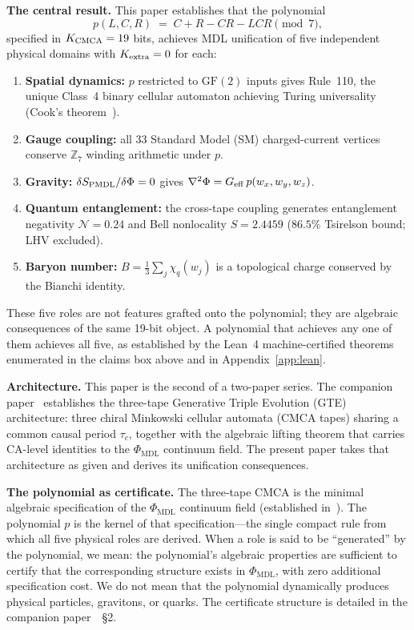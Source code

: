\documentclass[11pt]{article}
\theoremstyle{remark}
\newcommand{\PHIMDL}{\Phi_{\mathrm{MDL}}}
\newcommand{\ZS}{\mathbb{Z}_7}
\newcommand{\PMDL}{S_{\rm PMDL}}
\begin{document}
\medskip
\noindent\textbf{The central result.}
This paper establishes that the polynomial
\[
  p(L,C,R) \;=\; C + R - CR - LCR \pmod{7},
\]
specified in $K_{\rm CMCA} = 19$ bits, achieves MDL unification of five independent
physical domains with $K_{\rm extra} = 0$ for each:
\begin{enumerate}[label=(\arabic*),itemsep=2pt]
\item \textbf{Spatial dynamics:} $p$ restricted to $\mathrm{GF}(2)$ inputs gives
      Rule~110, the unique Class~4 binary cellular automaton achieving Turing
      universality (Cook's theorem~\cite{Cook2004}).
\item \textbf{Gauge coupling:} all 33 Standard Model (SM) charged-current vertices
      conserve $\ZS$ winding arithmetic under $p$.
\item \textbf{Gravity:} $\delta\PMDL/\delta\Phi = 0$ gives
      $\nabla^2\Phi = G_{\rm eff}\,p(w_x, w_y, w_z)$.
\item \textbf{Quantum entanglement:} the cross-tape coupling generates
      entanglement negativity $\mathcal{N} = 0.24$ and Bell nonlocality
      $S = 2.4459$ ($86.5\%$ Tsirelson bound; LHV excluded).
\item \textbf{Baryon number:} $B = \tfrac{1}{3}\sum_j\chi_q(w_j)$ is a
      topological charge conserved by the Bianchi identity.
\end{enumerate}

These five roles are not features grafted onto the polynomial; they are algebraic
consequences of the same 19-bit object. A polynomial that achieves any one of them
achieves all five, as established by the Lean~4 machine-certified theorems
enumerated in the claims box above and in Appendix~\ref{app:lean}.

\medskip
\noindent\textbf{Architecture.}
This paper is the second of a two-paper series.
The companion paper~\cite{SpivackThreeTapeCMCA} establishes the three-tape
Generative Triple Evolution (GTE) architecture: three chiral Minkowski cellular automata (CMCA tapes) sharing a
common causal period $\tau_c$, together with the algebraic lifting theorem that
carries CA-level identities to the $\PHIMDL$ continuum field. The present paper
takes that architecture as given and derives its unification consequences.

\medskip
\noindent\textbf{The polynomial as certificate.}
The three-tape CMCA is the minimal algebraic specification of the $\PHIMDL$
continuum field (established in~\cite{SpivackPhiMDLField,SpivackQGR}). The polynomial
$p$ is the kernel of that specification---the single compact rule from which all
five physical roles are derived. When a role is said to be ``generated'' by the
polynomial, we mean: the polynomial's algebraic properties are sufficient to
certify that the corresponding structure exists in $\PHIMDL$, with zero additional
specification cost. We do not mean that the polynomial dynamically produces physical
particles, gravitons, or quarks.
The certificate structure is detailed in the companion paper~\cite{SpivackThreeTapeCMCA}~\S2.
\end{document}

